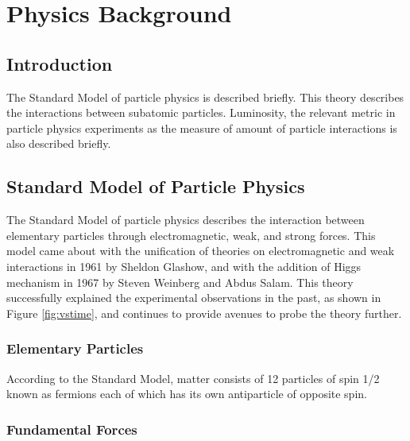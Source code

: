 \chapter{Physics Background} \label{ch:physBKGD}
\section{Introduction}

The Standard Model of particle physics is described briefly. This theory describes the interactions between subatomic particles. Luminosity, the relevant metric in particle physics experiments as the measure of amount of particle interactions is also described briefly.



\section {Standard Model of Particle Physics} \label{sec:stdModel}

The Standard Model of particle physics describes the interaction between elementary particles through electromagnetic, weak, and strong forces. This model came about with the unification of theories on electromagnetic and weak interactions in 1961 by Sheldon Glashow, and with the addition of Higgs mechanism in 1967 by Steven Weinberg and Abdus Salam. This theory successfully explained the experimental observations in the past, as shown in Figure \ref{fig:vstime}, and continues to provide avenues to probe the theory further.



\subsection {Elementary Particles}
According to the Standard Model, matter consists of 12 particles of spin 1/2 known as fermions each of which has its own antiparticle of opposite spin.


\subsection {Fundamental Forces}


